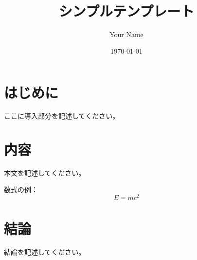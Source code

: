 \documentclass{ltjsarticle}
\title{シンプルテンプレート}
\author{Your Name}
\date{\today}
\begin{document}
\maketitle

\section{はじめに}
ここに導入部分を記述してください。

\section{内容}
本文を記述してください。

数式の例：
\begin{equation}
E = mc^2
\end{equation}

\section{結論}
結論を記述してください。
\end{document}

